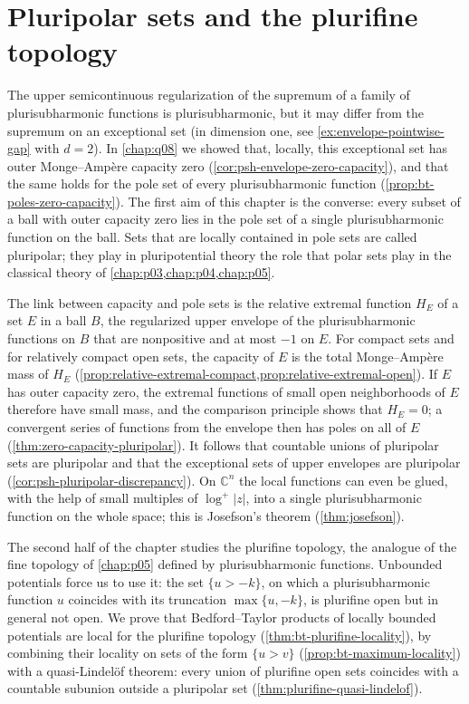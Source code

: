 \chapter{Pluripolar sets and the plurifine topology}
\label{chap:q03}

The upper semicontinuous regularization of the supremum of a family of plurisubharmonic functions is plurisubharmonic, but it may differ from the supremum on an exceptional set (in dimension one, see \cref{ex:envelope-pointwise-gap} with $d=2$). In \cref{chap:q08} we showed that, locally, this exceptional set has outer Monge--Amp\`ere capacity zero (\cref{cor:psh-envelope-zero-capacity}), and that the same holds for the pole set of every plurisubharmonic function (\cref{prop:bt-poles-zero-capacity}). The first aim of this chapter is the converse: every subset of a ball with outer capacity zero lies in the pole set of a single plurisubharmonic function on the ball. Sets that are locally contained in pole sets are called pluripolar; they play in pluripotential theory the role that polar sets play in the classical theory of \cref{chap:p03,chap:p04,chap:p05}.

The link between capacity and pole sets is the relative extremal function $H_E$ of a set $E$ in a ball $B$, the regularized upper envelope of the plurisubharmonic functions on $B$ that are nonpositive and at most $-1$ on $E$. For compact sets and for relatively compact open sets, the capacity of $E$ is the total Monge--Amp\`ere mass of $H_E$ (\cref{prop:relative-extremal-compact,prop:relative-extremal-open}). If $E$ has outer capacity zero, the extremal functions of small open neighborhoods of $E$ therefore have small mass, and the comparison principle shows that $H_E=0$; a convergent series of functions from the envelope then has poles on all of $E$ (\cref{thm:zero-capacity-pluripolar}). It follows that countable unions of pluripolar sets are pluripolar and that the exceptional sets of upper envelopes are pluripolar (\cref{cor:psh-pluripolar-discrepancy}). On $\mathbb C^n$ the local functions can even be glued, with the help of small multiples of $\log^+|z|$, into a single plurisubharmonic function on the whole space; this is Josefson's theorem (\cref{thm:josefson}).

The second half of the chapter studies the plurifine topology, the analogue of the fine topology of \cref{chap:p05} defined by plurisubharmonic functions. Unbounded potentials force us to use it: the set $\{u>-k\}$, on which a plurisubharmonic function $u$ coincides with its truncation $\max\{u,-k\}$, is plurifine open but in general not open. We prove that Bedford--Taylor products of locally bounded potentials are local for the plurifine topology (\cref{thm:bt-plurifine-locality}), by combining their locality on sets of the form $\{u>v\}$ (\cref{prop:bt-maximum-locality}) with a quasi-Lindel\"of theorem: every union of plurifine open sets coincides with a countable subunion outside a pluripolar set (\cref{thm:plurifine-quasi-lindelof}).

